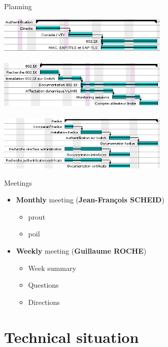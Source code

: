 \documentclass[12pt]{beamer}
\begin{document}
\begin{frame}{Planning}
\begin{center}
	\includegraphics[width=230pt]{img/gantt_auth.png}\\
~\\
	\includegraphics[width=230pt]{img/gantt_dot1x.png}\\
~\\
	\includegraphics[width=230pt]{img/gantt_radius.png}
\end{center}
\end{frame}

\begin{frame}{Meetings}
\begin{itemize}
    \item \textbf{Monthly} meeting (\textbf{Jean-François SCHEID})
	\vspace{0.2cm}
	\begin{itemize}
	\item prout
	\item poil
	\end{itemize}
	\vspace{0.8cm}\pause
    \item \textbf{Weekly} meeting (\textbf{Guillaume ROCHE})
	\vspace{0.2cm}
	\begin{itemize}
	\item Week summary
	\item Questions
	\item Directions
	\end{itemize}
    \end{itemize}
\end{frame}

\part{Technical situation}
\frame{\partpage}
\end{document}
